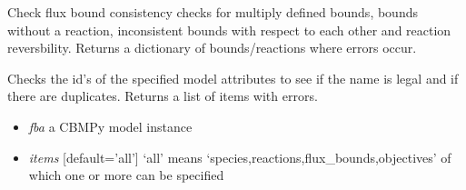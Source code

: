 \documentclass[a4paper,11pt,english]{sphinxmanual}
\begin{document}

\begin{fulllineitems}
\label{modules_doc:cbmpy.CBTools.checkFluxBoundConsistency}
Check flux bound consistency checks for multiply defined bounds, bounds without a reaction, inconsistent bounds with respect to each other
and reaction reversbility. Returns a dictionary of bounds/reactions where errors occur.

\end{fulllineitems}


\begin{fulllineitems}
\label{modules_doc:cbmpy.CBTools.checkIds}
Checks the id's of the specified model attributes to see if the name is legal and if there are duplicates.
Returns a list of items with errors.
\begin{itemize}
\item {} 
\emph{fba} a CBMPy model instance

\item {} 
\emph{items} {[}default='all'{]} `all' means `species,reactions,flux\_bounds,objectives' of which one or more can be specified

\end{itemize}

\end{fulllineitems}

\end{document}
